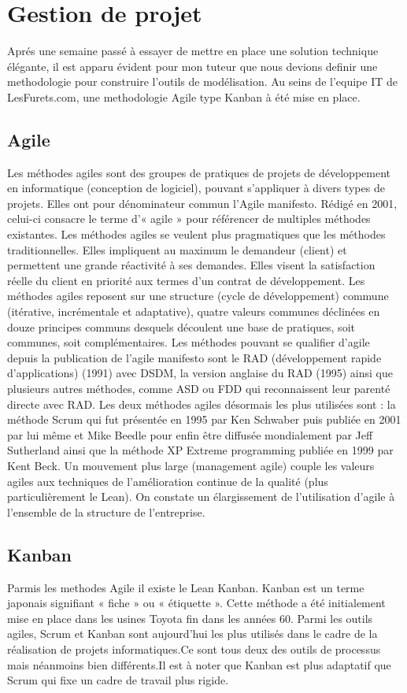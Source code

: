 \chapter{Gestion de projet}

Aprés une semaine passé à essayer de mettre en place une solution technique élégante, il est apparu évident pour mon tuteur que nous devions definir une methodologie pour construire l'outils de modélisation. Au seins de l'equipe IT de LesFurets.com, une methodologie Agile type Kanban à été mise en place.

\section{Agile}
Les méthodes agiles sont des groupes de pratiques de projets de développement en informatique (conception de logiciel), pouvant s'appliquer à divers types de projets. Elles ont pour dénominateur commun l'Agile manifesto. Rédigé en 2001, celui-ci consacre le terme d'« agile » pour référencer de multiples méthodes existantes. Les méthodes agiles se veulent plus pragmatiques que les méthodes traditionnelles. Elles impliquent au maximum le demandeur (client) et permettent une grande réactivité à ses demandes. Elles visent la satisfaction réelle du client en priorité aux termes d'un contrat de développement.
Les méthodes agiles reposent sur une structure (cycle de développement) commune (itérative, incrémentale et adaptative), quatre valeurs communes déclinées en douze principes communs desquels découlent une base de pratiques, soit communes, soit complémentaires.
Les méthodes pouvant se qualifier d'agile depuis la publication de l'agile manifesto sont le RAD (développement rapide d'applications) (1991) avec DSDM, la version anglaise du RAD (1995) ainsi que plusieurs autres méthodes, comme ASD ou FDD qui reconnaissent leur parenté directe avec RAD. Les deux méthodes agiles désormais les plus utilisées sont : la méthode Scrum qui fut présentée en 1995 par Ken Schwaber puis publiée en 2001 par lui même et Mike Beedle pour enfin être diffusée mondialement par Jeff Sutherland ainsi que la méthode XP Extreme programming publiée en 1999 par Kent Beck.
Un mouvement plus large (management agile) couple les valeurs agiles aux techniques de l'amélioration continue de la qualité (plus particulièrement le Lean). On constate un élargissement de l'utilisation d'agile à l'ensemble de la structure de l'entreprise.

\section{Kanban}
Parmis les methodes Agile il existe le Lean Kanban.
Kanban est un terme japonais signifiant « fiche » ou « étiquette ».
Cette méthode a été initialement mise en place dans les usines Toyota fin dans les années 60.
Parmi les outils agiles, Scrum et Kanban sont aujourd'hui les plus utilisés dans le cadre de la réalisation de projets informatiques.Ce sont tous deux des outils de processus mais néanmoins bien différents.Il est à noter que Kanban est plus adaptatif que Scrum qui fixe un cadre de travail plus rigide.

